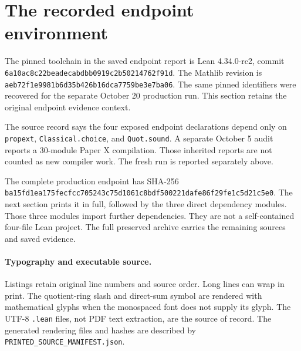 \documentclass[11pt]{article}
\newcommand{\code}[1]{\nolinkurl{#1}}
\begin{document}
\KomorebiCover
\begin{abstract}
This guide explains the source contracts behind Chapter X rather than treating its
terminal signature as a stand-in for the mathematics. It provides a concordance
of the twenty source records, follows the two independent construction branches,
and distinguishes arithmetic occurrence, finite trace recovery, carrier
presentations, local comparison data, and nonzero occupancy. Four complete
production modules are printed from preserved source. Their saved verification
and the separate October 20 production replay remain explicit.
\end{abstract}
\tableofcontents
\clearpage


\clearpage
\section{The recorded endpoint environment}
The pinned toolchain in the saved endpoint report is Lean 4.34.0-rc2, commit
\code{6a10ac8c22beadecabdbb0919c2b50214762f91d}. The Mathlib revision is
\code{aeb72f1e9981b6d35b426b16dca7759be3e7ba06}. The same pinned identifiers were recovered for the separate October 20
production run. This section retains the original endpoint evidence context.

The source record says the four exposed endpoint declarations depend only on
\code{propext}, \code{Classical.choice}, and \code{Quot.sound}. A separate
October 5 audit reports a 30-module Paper X compilation. Those inherited reports
are not counted as new compiler work. The fresh run is reported separately above.

The complete production endpoint has SHA-256
\code{ba15fd1ea175fecfcc705243c75d1061c8bdf500221dafe86f29fe1c5d21c5e0}.
The next section prints it in full, followed by the three direct dependency
modules. Those three modules import further dependencies. They are not a
self-contained four-file Lean project. The full preserved archive carries the
remaining sources and saved evidence.

\paragraph{Typography and executable source.}
Listings retain original line numbers and source order. Long lines can wrap in
print. The quotient-ring slash and direct-sum symbol are rendered with mathematical glyphs when the
monospaced font does not supply its glyph. The UTF-8 \code{.lean} files, not
PDF text extraction, are the source of record. The generated rendering files
and hashes are described by \code{PRINTED_SOURCE_MANIFEST.json}.
\end{document}
